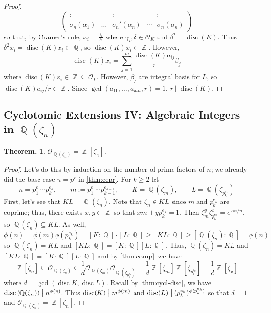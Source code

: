 \documentclass[11pt, a4paper]{memoir}
\DeclareMathOperator{\Q}{{\mathbb{Q}}}
\DeclareMathOperator{\Z}{{\mathbb{Z}}}
\renewcommand{\div}{\bigm|}
\theoremstyle{change}
\newtheorem{theorem}{Theorem.}[section]
\theoremstyle{plain}
\theoremstyle{nonumberplain}
\newtheorem{proof}{Proof}
\DeclareMathOperator{\disc}{disc}
\begin{document}
\begin{proof}
\begin{equation*}
\begin{pmatrix}
            \vdots&&\vdots&&\vdots\\
            \sigma_n(\alpha_1)&\hdots&\sigma_n'(\alpha_n)&\cdots&\sigma_n(\alpha_n)
        \end{pmatrix}
    \end{equation*}
    so that, by Cramer's rule, $x_i=\frac{\gamma_i}{\delta}$ where $\gamma_i,\delta\in\mathcal{O}_K$ and $\delta^2=\disc(K)$.
    Thus $\delta^2x_i=\disc(K)x_i\in\Q$, so $\disc(K)x_i\in\Z$.
    However,
    \begin{equation*}
        \disc(K)x_i = \sum\limits_{j=1}^m\frac{\disc(K)a_{ij}}{r}\beta_j
    \end{equation*}
    where $\disc(K)x_i\in\Z\subseteq\mathcal{O}_L$.
    However, $\beta_j$ are integral basis for $L$, so $\disc(K)a_{ij}/r\in\Z$.
    Since $\gcd(a_{11},\ldots,a_{mn},r)=1$, $r\mid\disc(K)$.
\end{proof}
\subsection{Cyclotomic Extensions IV: Algebraic Integers in \texorpdfstring{$\Q(\zeta_n)$}{Qzn}}
\begin{theorem}
    $\mathcal{O}_{\Q(\zeta_n)}=\Z[\zeta_n]$.
\end{theorem}
\begin{proof}
    Let's do this by induction on the number of prime factors of $n$; we already did the base case $n=p^r$ in \cref{thm:cepr}.
    For $k\geq 2$ let
    \begin{equation*}
        n=p_1^{e_1}\cdots p_k^{e_k},\qquad m:=p_1^{e_1}\cdots p_{k-1}^{e_{k-1}},\qquad K=\Q\left(\zeta_{m}\right),\qquad L=\Q\left(\zeta_{p_k^{e_k}}\right)
    \end{equation*}
    First, let's see that $KL=\Q(\zeta_n)$.
    Note that $\zeta_n\in KL$ since $m$ and $p_k^{e_k}$ are coprime; thus, there exists $x,y\in\Z$ so that $xm+yp_k^{e_k}=1$.
    Then $\zeta_m^y\zeta_{p_k^{e_k}}^x=e^{2\pi i/n}$, so $\Q(\zeta_n)\subseteq KL$.
    As well,
    \begin{equation*}
        \phi(n)=\phi(m)\phi\left(p_k^{e_k}\right)=[K:\Q]\cdot[L:\Q]\geq [KL:\Q]\geq[\Q(\zeta_n):\Q]=\phi(n)
    \end{equation*}
    so $\Q(\zeta_n)=KL$ and $[KL:\Q]=[K:\Q][L:\Q]$.
    Thus, $\Q(\zeta_n)=KL$ and $[KL:\Q]=[K:\Q][L:\Q]$ and by \cref{thm:comp}, we have
    \begin{equation*}
        \Z[\zeta_n]\subseteq \mathcal{O}_{\Q(\zeta_n)}\subseteq\frac{1}{d}\mathcal{O}_{\Q(\zeta_m)}\mathcal{O}_{\Q(\zeta_{p_k^{e_k}})}=\frac{1}{d}\Z[\zeta_m]\Z[\zeta_{p_k^{e_k}}]=\frac{1}{d}\Z[\zeta_n]
    \end{equation*}
    where $d=\gcd(\disc K,\disc L)$.
    Recall by \cref{thm:cycl-disc}, we have $\disc\left(\Q(\zeta_n)\right)\div n^{\phi(n)}$.
    Thus $\disc(K)\div m^{\phi(m)}$ and $\disc(L)\div (p_k^{e_k})^{\phi(p_k^{e_k})}$ so that $d=1$ and $\mathcal{O}_{\Q(\zeta_n)}=\Z[\zeta_n]$.
\end{proof}
\end{document}
